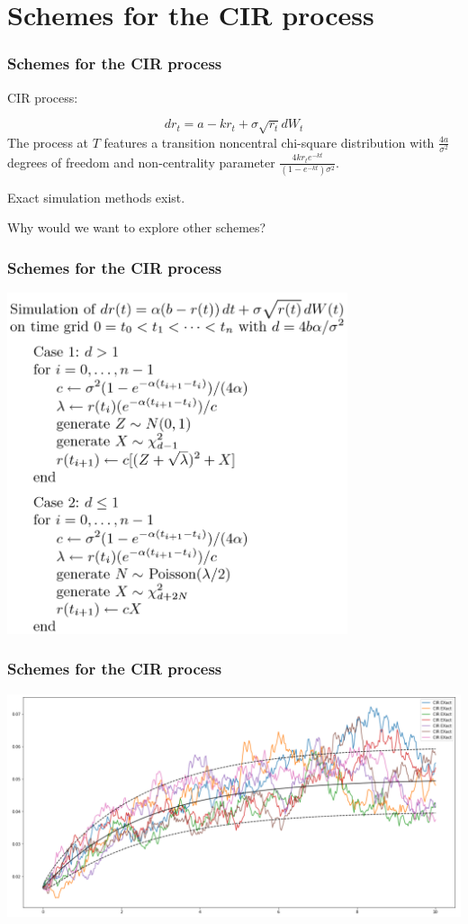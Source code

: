 \documentclass[12pt]{beamer}
\begin{document}
\section{Schemes for the CIR process}
\frame{\tableofcontents[currentsection]}

\begin{frame}
\frametitle{Schemes for the CIR process}
\centerline{CIR process:}
$$
	dr_{t}  = a - kr_{t} + \sigma \sqrt{r_{t}} dW_{t}
$$
The process at $T$ features a transition noncentral chi-square distribution with $\frac{4a}{\sigma^2}$ degrees of freedom and non-centrality parameter $\frac{4kr_te^{-kt}}{(1 - e^{-kt})\sigma^2}$.
\vspace{0.5cm}

Exact simulation methods exist.
\vspace{0.5cm}

Why would we want to explore other schemes?
\end{frame}

\begin{frame}
\frametitle{Schemes for the CIR process}
\centering
\includegraphics[width=0.75\textwidth]{exact_scheme.png}
\end{frame}

\begin{frame}
\frametitle{Schemes for the CIR process}
\centering
\includegraphics[width=\textwidth]{paths_exact.png}
\end{frame}
\end{document}
